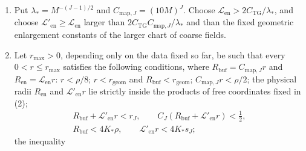 \begin{definition}
\begin{enumerate}
strictly inside the larger construction domains, with $r_c,r_z$ as in \cref{ch11:lem:classical-calculation}. The square root in the normalized fluctuation variables is the positive square root of the constrained Hessian at the conditional constrained minimizer. All geometric and Hessian constants on these domains are fixed, including $r_{\mathrm{geom}}$ and $C_{\mathrm{TG}}$ of \cref{ch11:thm:all-point-torus-chart}, which we apply with this branch as its coordinate domain. We decrease $r_{\mathrm{geom}}$, before $r$ is chosen, so that the bounds on all intermediate coarse logarithms, free logarithms, and relative logarithms in the proof of that theorem lie strictly below $r_c$, $r_z$, and $r_{\mathrm{CO}}$, respectively, and so that every constraint determinant $\det D_{X_{e^*_a}}\mathsf C_{c,a}(\Gamma_c(z))$ is positive. These bounds are linear in $u$, and the determinants are continuous and equal to $\det(M^{-2}I_3)>0$ at the identity, so this is one fixed reduction. Thus, whenever $u<r_{\mathrm{geom}}$ and both endpoint fields lie in $D_u$, the coordinates of \cref{ch11:thm:all-point-torus-chart} satisfy precisely the branch conditions used in $\mathcal A_{k,J}$ below.
\item Put $\lambda_*=M^{-(J-1)/2}$ and $C_{\mathrm{map},J}=(10M)^J$. Choose $\mathscr L_{\mathrm{en}}>2C_{\mathrm{TG}}/\lambda_*$, and choose $\mathscr L'_{\mathrm{en}}\ge\mathscr L_{\mathrm{en}}$ larger than $2C_{\mathrm{TG}}C_{\mathrm{map},J}/\lambda_*$ and than the fixed geometric enlargement constants of the larger chart of coarse fields.
\item Let $r_{\max}>0$, depending only on the data fixed so far, be such that every $0<r\le r_{\max}$ satisfies the following conditions, where $R_{\mathrm{buf}}=C_{\mathrm{map},J}r$ and $R_{\mathrm{en}}=\mathscr L_{\mathrm{en}}r$: $r<\rho/8$; $r<r_{\mathrm{geom}}$ and $R_{\mathrm{buf}}<r_{\mathrm{geom}}$; $C_{\mathrm{map},J}r<\rho/2$; the physical radii $R_{\mathrm{en}}$ and $\mathscr L'_{\mathrm{en}}r$ lie strictly inside the products of free coordinates fixed in (2);
\begin{equation}\label{ch11:eq:reserved-domain-gates}
 \begin{gathered}
 R_{\mathrm{buf}}+\mathscr L'_{\mathrm{en}}r<r_J,\qquad
 C_J(R_{\mathrm{buf}}+\mathscr L'_{\mathrm{en}}r)<\tfrac12,\\
 R_{\mathrm{buf}}<4K_*\rho,\qquad \mathscr L'_{\mathrm{en}}r<4K_*s_J;
 \end{gathered}
\end{equation}
the inequality
\[
\]
\end{enumerate}
\end{definition}
